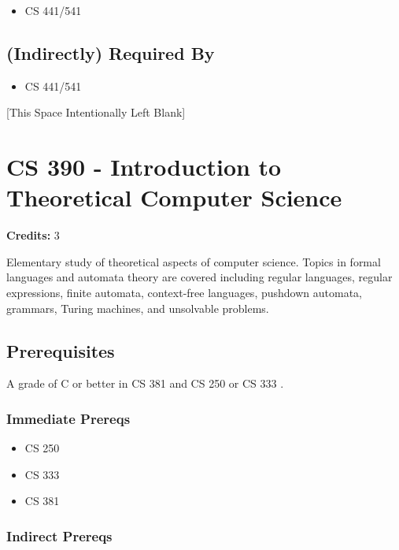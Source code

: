 \documentclass[]{article}
\providecommand{\tightlist}{%
  \setlength{\itemsep}{0pt}\setlength{\parskip}{0pt}}
\newcommand{\pagebreakhere}{
\vspace*{\fill}
\begin{center}
[This Space Intentionally Left Blank]
\end{center}
\vspace*{\fill}
\newpage
}
\begin{document}
\begin{itemize}
\tightlist
\item
  CS 441/541
\end{itemize}

\subsection{(Indirectly) Required By}\label{indirectly-required-by-12}

\begin{itemize}
\tightlist
\item
  CS 441/541
\end{itemize}

\pagebreakhere
\section{CS 390 - Introduction to Theoretical Computer
Science}\label{cs-390---introduction-to-theoretical-computer-science}

\textbf{Credits:} 3

Elementary study of theoretical aspects of computer science. Topics in
formal languages and automata theory are covered including regular
languages, regular expressions, finite automata, context-free languages,
pushdown automata, grammars, Turing machines, and unsolvable problems.

\subsection{Prerequisites}\label{prerequisites-24}

A grade of C or better in CS 381 and CS 250 or CS 333 .

\subsubsection{Immediate Prereqs}\label{immediate-prereqs-17}

\begin{itemize}
\tightlist
\item
  CS 250
\item
  CS 333
\item
  CS 381
\end{itemize}

\subsubsection{Indirect Prereqs}\label{indirect-prereqs-17}
\end{document}
